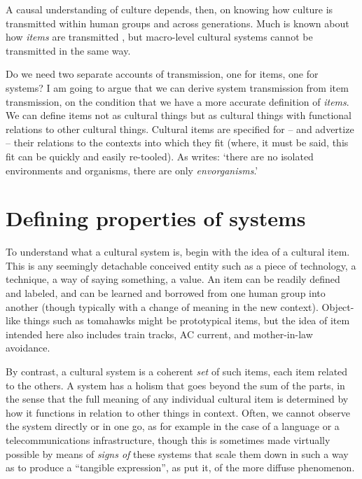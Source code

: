 A causal understanding of culture depends, then, on knowing how culture is transmitted within human groups and across 
generations. Much is known about how \textit{items} are transmitted 
\citep{rogers_diffusion_2003}, but macro-level cultural systems cannot be 
transmitted in the same way. 



Do we need two separate accounts of transmission, one for items, one for 
systems? I am going to argue that we can derive system transmission from 
item transmission, on the condition that we have a more accurate 
definition of \textit{items}. We can define items not as cultural things but as 
cultural things with functional relations to other cultural things. 
Cultural items are specified for -- and advertize -- their relations to the 
contexts into which they fit (where, it must be said, this fit can be 
quickly and easily re-tooled). As \citet[19]{kockelman_agent_2013} writes: \textquoteleft there 
are no isolated environments and organisms, there are only \textit{envorganisms}.' 

\section{Defining properties of systems}

To understand what a cultural system is, begin with the idea of a cultural item. This is any seemingly detachable conceived entity such 
as a piece of technology, a technique, a way of saying something, a 
value. An item can be readily defined and labeled, and can be learned 
and borrowed from one human group into another (though typically with 
a change of meaning in the new context). Object-like 
things such as tomahawks might be prototypical items, but the idea of 
item intended here also includes train tracks, AC current, and 
mother-in-law avoidance. 



By contrast, a cultural system is a coherent \textit{set} of such items, each 
item related to the others. A system has a holism that goes 
beyond the sum of the parts, in the sense that the full meaning of any 
individual cultural item is determined by how it functions in relation to other things in context. Often, we cannot observe the system directly or in one go, as for 
example in the case of a language or a telecommunications 
infrastructure, though this is sometimes made virtually possible by 
means of \textit{signs of} these systems that scale them down in such 
a way as to produce a ``tangible expression'', as \citet[208]{durkheim_elementary_1912} put it, of the more diffuse phenomenon. 



